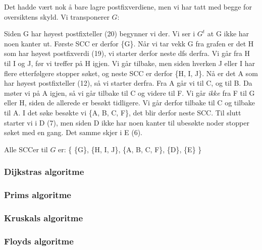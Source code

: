 \begin{eks}
Det hadde vært nok å bare lagre postfixverdiene, men vi har tatt med begge for oversiktens skyld. Vi transponerer $ G $:

\begin{figure}[H]
\centering
{}
\end{figure}
\end{eks}

Siden G har høyest postfixteller (20) begynner vi der. Vi ser i $ G^t $ at G ikke har noen kanter ut. Første SCC er derfor \{G\}. Når vi tar vekk G fra grafen er det H som har høyest postfixverdi (19), vi starter derfor neste dfs derfra. Vi går fra H til I og J, før vi treffer på H igjen. Vi går tilbake, men siden hverken J eller I har flere etterfølgere stopper søket, og neste SCC er derfor \{H, I, J\}. Nå er det A som har høyest postfixteller (12), så vi starter derfra. Fra A går vi til C, og til B. Da møter vi på A igjen, så vi går tilbake til C og videre til F. Vi går \emph{ikke} fra F til G eller H, siden de allerede er besøkt tidligere. Vi går derfor tilbake til C og tilbake til A. I det søke besøkte vi \{A, B, C, F\}, det blir derfor neste SCC. Til slutt starter vi i D (7), men siden D ikke har noen kanter til ubesøkte noder stopper søket med en gang. Det samme skjer i E (6). 

Alle SCCer til $ G $ er: \{ \{G\}, \{H, I, J\}, \{A, B, C, F\}, \{D\}, \{E\} \}


\subsubsection{\color{red}Dijkstras algoritme}
\label{dijkstra}

\subsubsection{\color{red}Prims algoritme}
\label{prim}

\subsubsection{\color{red}Kruskals algoritme}
\label{kruskal}

\subsubsection{\color{red}Floyds algoritme}
\label{floyd}